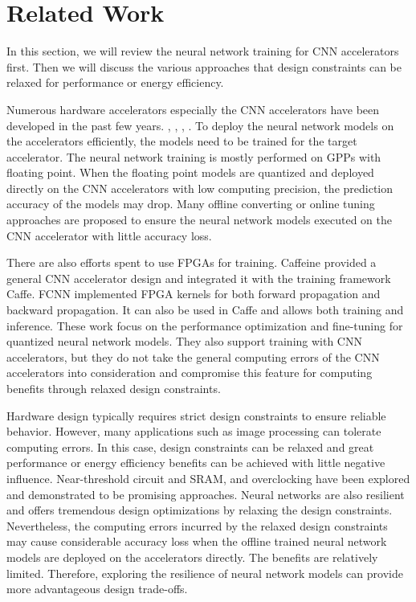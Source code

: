 \section{Related Work} \label{sec:relatedwork}
In this section, we will review the neural network training for CNN accelerators first.
Then we will discuss the various approaches that design constraints can be relaxed for
performance or energy efficiency. 

Numerous hardware accelerators especially the CNN accelerators have
been developed in the past few years. \cite{Cnvlutin_25} 
\cite{deepburing_12}, \cite{Aydonat_27}, 
\cite{Caffeine_6}, \cite{Wei_29}. To 
deploy the neural network models on the accelerators efficiently, 
the models need to be trained for the target accelerator. 
The neural network training is mostly performed on GPPs with floating point.
When the floating point models are quantized and deployed directly 
on the CNN accelerators with low computing precision, the prediction 
accuracy of the models may drop\cite{Matthieu2014_8, Hwang2014_17}. 
Many offline converting or online tuning approaches are proposed to 
ensure the neural network models executed on the CNN accelerator 
with little accuracy loss\cite{BinaryConnect_14,courbariaux2014}. 

There are also efforts spent to use FPGAs for training. 
Caffeine\cite{Caffeine_6} provided a general CNN accelerator design and integrated it with 
the training framework Caffe. FCNN\cite{fcnn_5} implemented FPGA kernels 
for both forward propagation and backward propagation. It can also be used in Caffe 
and allows both training and inference. These work focus on the performance optimization 
and fine-tuning for quantized neural network models. 
They also support training with CNN accelerators, but they do not take the general 
computing errors of the CNN accelerators into consideration and compromise this 
feature for computing benefits through relaxed design constraints.

Hardware design typically requires strict design constraints to ensure 
reliable behavior. However, many applications such as image processing 
can tolerate computing errors. In this case, design constraints can be 
relaxed and great performance or energy efficiency benefits can be achieved 
with little negative influence. Near-threshold circuit\cite{M2017NT,BH2005} 
and SRAM\cite{G2010SRAM,SA2008SRAM}, 
and overclocking \cite{overclock_3} have been explored and demonstrated 
to be promising approaches. Neural networks are also resilient and 
offers tremendous design optimizations by relaxing the design constraints. 
Nevertheless, the computing errors incurred by the relaxed design constraints 
may cause considerable accuracy loss when the offline 
trained neural network models are deployed on the accelerators directly. 
The benefits are relatively limited. Therefore, exploring the resilience 
of neural network models can provide more advantageous design trade-offs. 
